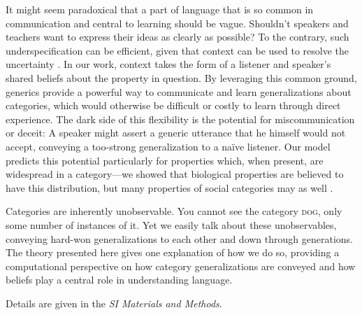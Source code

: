 \documentclass{pnastwo}
\begin{document}
\begin{article}
It might seem paradoxical that a part of language that is so common in communication and central to learning should be vague. 
Shouldn't speakers and teachers want to express their ideas as clearly as possible?
To the contrary, such underspecification can be efficient, given that context can be used to resolve the uncertainty \cite{Piantadosi2012}.
In our work, context takes the form of a listener and speaker's shared beliefs about the property in question. 
By leveraging this common ground, generics provide a powerful way to communicate and learn generalizations about categories, 
which would otherwise be difficult or costly to learn through direct experience.
The dark side of this flexibility is the potential for miscommunication or deceit: A speaker might assert a generic utterance that he himself would not accept, conveying a too-strong generalization to a na\"{i}ve listener.  
Our model predicts this potential particularly for properties which, when present, are widespread in a category---we showed that biological properties are believed to have this distribution, but many properties of social categories may as well \cite{Cimpian2011a,Cimpian2012b,Rhodes2012}.


Categories are inherently unobservable. 
You cannot see the category \textsc{dog}, only some number of instances of it.
Yet we easily talk about these unobservables, conveying hard-won generalizations to each other and down through generations.
The theory presented here gives one explanation of how we do so, providing a computational perspective on how category generalizations are conveyed and how beliefs play a central role in understanding language.







\begin{materials}
Details are given in the {\it SI Materials and Methods}.



\end{materials}
\end{article}
\end{document}
